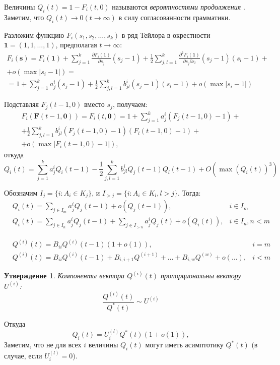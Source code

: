 \documentclass[12pt]{article}
\newtheorem{statement}{Утверждение}
\begin{document}
Величины $Q_i(t) = 1 - F_i(t, 0)$ называются \textit{вероятностями продолжения} \cite{sevast-processes}. Заметим, что $Q_i(t) \rightarrow 0 (t \rightarrow \infty)$ в силу согласованности грамматики.

Разложим функцию $F_i(s_1, s_2, \ldots, s_k)$ в ряд Тейлора в окрестности $\textbf{1} = (1, 1, \ldots, 1)$, предполагая $t \rightarrow \infty$:
\begin{multline}
	F_i(\textbf{s}) = F_i(\textbf{1}) + \sum_{j = 1}^k \frac{\partial F_i(\textbf{1})}{\partial s_j} (s_j - 1) + \frac{1}{2} \sum_{j, l = 1}^k \frac{\partial^2 F_i(\textbf{1})}{\partial s_j \partial s_l} (s_j - 1) (s_l - 1) + \\
	+ o(\max \left|s_i - 1\right|) = \\
	= 1 + \sum_{j = 1}^k a^i_j (s_j - 1) + \frac{1}{2} \sum_{j,l = 1}^k b^i_{jl} (s_j - 1) (s_l - 1) + o(\max \left|s_i - 1\right|)
\end{multline}

Подставляя $F_j(t-1, 0)$ вместо $s_j$, получаем:
\begin{multline}
	F_i(\textbf{F}(t-1, \textbf{0})) = F_i(t, \textbf{0}) = 1 + \sum_{j = 1}^k a^i_j (F_j(t-1, 0) - 1) + \\
	+ \frac{1}{2} \sum_{j,l = 1}^k b^i_{jl} (F_j(t-1, 0) - 1) (F_l(t-1, 0)- 1) + \\
	+ o(\max \left| F_i(t-1, 0) - 1 \right|),
\end{multline}
откуда
\begin{equation}
	Q_i(t) = \sum_{j = 1}^k a^i_j Q_i(t-1) - \frac{1}{2} \sum_{j,l = 1}^k b^i_{jl} Q_j(t-1) Q_l(t-1) + O(\max (Q_i(t))^3)
\end{equation}

Обозначим $I_j = \{ i : A_i \in K_j \}$, и $I_{>j} = \{ i : A_i \in K_l, l > j \}$. Тогда:
\begin{align}
	& Q_i(t) = \sum_{j \in I_m} a^i_j Q_j(t-1) + o(Q_j(t-1)), & i \in I_m \\
	& Q_i(t) = \sum_{j \in I_n} a^i_j Q_j(t-1) + \sum_{j \in I_{>n}} a^i_j Q_j(t) + o(Q_i(t)), & i \in I_n, n < m
\end{align}

\begin{align}
	& Q^{(i)}(t) = B_{ii} Q^{(i)}(t-1) (1 + o(1)), & i = m \\
	& Q^{(i)}(t) = B_{ii} Q^{(i)}(t-1) + B_{i,i+1} Q^{(i+1)} + \ldots + B_{i,w} Q^{(w)} + o(\ldots), & i < m
\end{align}

\begin{statement}
	Компоненты вектора $Q^{(i)}(t)$ пропорциональны вектору $U^{(i)}$:
	\begin{equation}
		\frac{Q^{(i)}(t)}{Q^*(t)} \sim U^{(i)}
	\end{equation}
\end{statement}
Откуда
\begin{equation}
	Q_i(t) = U^{(l)}_i Q^*(t) (1 + o(1)),
\end{equation}
Заметим, что не для всех $i$ величины $Q_i(t)$ могут иметь асимптотику $Q^*(t)$ (в случае, если $U^{(l)}_i = 0$).
\end{document}
